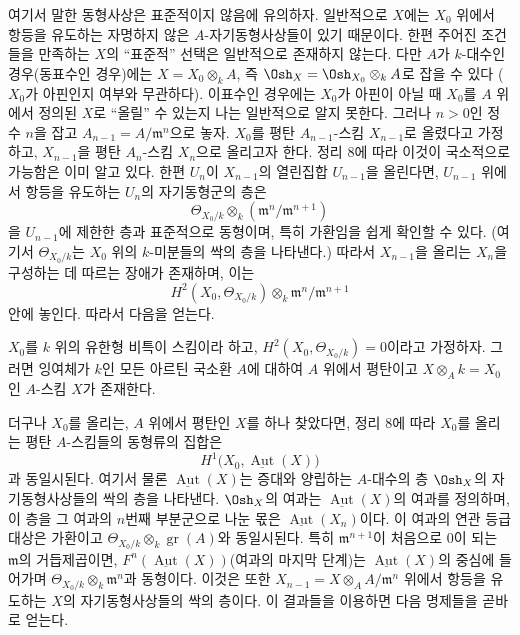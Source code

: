 여기서 말한 동형사상은 표준적이지 않음에 유의하자. 일반적으로 $X$에는
$X_0$ 위에서 항등을 유도하는 자명하지 않은 $A$-자기동형사상들이 있기
때문이다. 한편 주어진 조건들을 만족하는 $X$의 ``표준적'' 선택은 일반적으로
존재하지 않는다. 다만 $A$가 $k$-대수인 경우(동표수인 경우)에는
$X=X_0\otimes_k A$, 즉 $\Osh_X=\Osh_{X_0}\otimes_k A$로 잡을 수 있다
($X_0$가 아핀인지 여부와 무관하다). 이표수인 경우에는 $X_0$가 아핀이 아닐
때 $X_0$를 $A$ 위에서 정의된 $X$로 ``올릴'' 수 있는지 나는 일반적으로
알지 못한다. 그러나 $n>0$인 정수 $n$을 잡고
$A_{n-1}=A/\mathfrak m^n$으로 놓자. $X_0$를 평탄 $A_{n-1}$-스킴
$X_{n-1}$로 올렸다고 가정하고, $X_{n-1}$을 평탄 $A_n$-스킴 $X_n$으로
올리고자 한다. 정리 8에 따라 이것이 국소적으로 가능함은 이미 알고 있다.
한편 $U_n$이 $X_{n-1}$의 열린집합 $U_{n-1}$을 올린다면, $U_{n-1}$ 위에서
항등을 유도하는 $U_n$의 자기동형군의 층은
\[
  \Theta_{X_0/k}\otimes_k(\mathfrak m^n/\mathfrak m^{n+1})
\]
을 $U_{n-1}$에 제한한 층과 표준적으로 동형이며, 특히 가환임을 쉽게
확인할 수 있다. (여기서 $\Theta_{X_0/k}$는 $X_0$ 위의 $k$-미분들의
싹의 층을 나타낸다.) 따라서 $X_{n-1}$을 올리는 $X_n$을 구성하는 데
따르는 장애가 존재하며, 이는
\[
  H^2(X_0,\Theta_{X_0/k})\otimes_k
  \mathfrak m^n/\mathfrak m^{n+1}
\]
안에 놓인다. 따라서 다음을 얻는다.

 $X_0$를 $k$ 위의 유한형 비특이 스킴이라 하고,
$H^2(X_0,\Theta_{X_0/k})=0$이라고 가정하자. 그러면 잉여체가 $k$인 모든
아르틴 국소환 $A$에 대하여 $A$ 위에서 평탄이고
$X\otimes_A k=X_0$인 $A$-스킴 $X$가 존재한다.

더구나 $X_0$를 올리는, $A$ 위에서 평탄인 $X$를 하나 찾았다면, 정리 8에
따라 $X_0$를 올리는 평탄 $A$-스킴들의 동형류의 집합은
\[
  H^1\bigl(X_0,\underline{\operatorname{Aut}}(X)\bigr)
\]
과 동일시된다. 여기서 물론 $\underline{\operatorname{Aut}}(X)$는 증대와
양립하는 $A$-대수의 층 $\Osh_X$의 자기동형사상들의 싹의 층을 나타낸다.
$\Osh_X$의 여과는 $\underline{\operatorname{Aut}}(X)$의 여과를 정의하며,
이 층을 그 여과의 $n$번째 부분군으로 나눈 몫은
$\underline{\operatorname{Aut}}(X_n)$이다. 이 여과의 연관 등급 대상은
가환이고 $\Theta_{X_0/k}\otimes_k\operatorname{gr}(A)$와 동일시된다.
특히 $\mathfrak m^{n+1}$이 처음으로 0이 되는 $\mathfrak m$의 거듭제곱이면,
$F^n(\underline{\operatorname{Aut}}(X))$(여과의 마지막 단계)는
$\underline{\operatorname{Aut}}(X)$의 중심에 들어가며
$\Theta_{X_0/k}\otimes_k\mathfrak m^n$과 동형이다. 이것은 또한
$X_{n-1}=X\otimes_A A/\mathfrak m^n$ 위에서 항등을 유도하는 $X$의
자기동형사상들의 싹의 층이다. 이 결과들을 이용하면 다음 명제들을 곧바로
얻는다.


